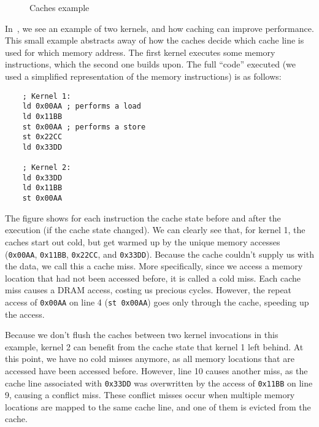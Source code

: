 \begin{figure}[hbt]
    \centering
    \caption{Caches example}
    \label{fig:normal-exec}
\end{figure}

In~, we see an example of two kernels, and how caching can improve performance.
This small example abstracts away of how the caches decide which cache line is used for which memory address.
The first kernel executes some memory instructions, which the second one builds upon.
The full ``code'' executed (we used a simplified representation of the memory instructions) is as follows:
\begin{verbatim}
    ; Kernel 1:
    ld 0x00AA ; performs a load
    ld 0x11BB
    st 0x00AA ; performs a store
    st 0x22CC
    ld 0x33DD

    ; Kernel 2:
    ld 0x33DD
    ld 0x11BB
    st 0x00AA
\end{verbatim}

The figure shows for each instruction the cache state before and after the execution (if the cache state changed).
We can clearly see that, for kernel 1, the caches start out cold, but get warmed up by the unique memory accesses (\verb|0x00AA|, \verb|0x11BB|, \verb|0x22CC|, and \verb|0x33DD|).
Because the cache couldn't supply us with the data, we call this a cache miss.
More specifically, since we access a memory location that had not been accessed before, it is called a cold miss.
Each cache miss causes a DRAM access, costing us precious cycles.
However, the repeat access of \verb|0x00AA| on line 4 (\texttt{st 0x00AA}) goes only through the cache, speeding up the access.

Because we don't flush the caches between two kernel invocations in this example, kernel 2 can benefit from the cache state that kernel 1 left behind.
At this point, we have no cold misses anymore, as all memory locations that are accessed have been accessed before.
However, line 10 causes another miss, as the cache line associated with \verb|0x33DD| was overwritten by the access of \verb|0x11BB| on line 9, causing a conflict miss.
These conflict misses occur when multiple memory locations are mapped to the same cache line, and one of them is evicted from the cache.


